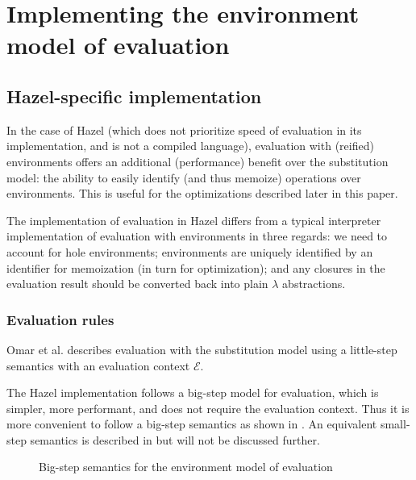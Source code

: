 \section{Implementing the environment model of evaluation}
\label{sec:env_model_evaluation}

\subsection{Hazel-specific implementation}
\label{sec:eval_with_envs}

In the case of Hazel (which does not prioritize speed of evaluation in its implementation, and is not a compiled language), evaluation with (reified) environments offers an additional (performance) benefit over the substitution model: the ability to easily identify (and thus memoize) operations over environments. This is useful for the optimizations described later in this paper.

The implementation of evaluation in Hazel differs from a typical interpreter implementation of evaluation with environments in three regards: we need to account for hole environments; environments are uniquely identified by an identifier for memoization (in turn for optimization); and any closures in the evaluation result should be converted back into plain $\lambda$ abstractions.

\subsubsection{Evaluation rules}
\label{sec:evalenv-rules}


Omar et al. \cite{conf/popl/HazelnutLive19} describes evaluation with the substitution model using a little-step semantics with an evaluation context $\mathcal{E}$. 

The Hazel implementation follows a big-step model for evaluation, which is simpler, more performant, and does not require the evaluation context. Thus it is more convenient to follow a big-step semantics as shown in . An equivalent small-step semantics is described in  but will not be discussed further.

\begin{figure}
  \centering
  \begin{mdframed}
    \begin{singlespace}
      
    \end{singlespace}
  \end{mdframed}
  \caption{Big-step semantics for the environment model of evaluation}
  \label{fig:big-step-formal}
\end{figure}

